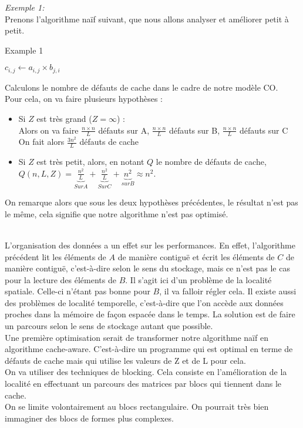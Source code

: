 \documentclass[
  paper=a4,
  ,captions=tableheading
]{scrartcl}
\begin{document}
\emph{Exemple 1:}\\
Prenons l'algorithme naïf suivant, que nous allons analyser et améliorer
petit à petit.

\begin{algorithm}[H]
\caption{Example 1}
\begin{algorithmic}[1]
\Statex
 
      \State $c_{i,j} \gets a_{i,j} \times b_{j,i}$
    \EndFor
  \EndFor
\end{algorithmic}
\end{algorithm}

Calculons le nombre de défauts de cache dans le cadre de notre modèle
CO.\\
Pour cela, on va faire plusieurs hypothèses :

\begin{itemize}
\item
  Si \(Z\) est très grand (\(Z = \infty\)) :\\
  Alors on va faire \(\frac{n \times n}{L}\) défauts sur A,
  \(\frac{n \times n}{L}\) défauts sur B, \(\frac{n \times n}{L}\)
  défauts sur C\\
  On fait alors \(\frac{3n^2}{L}\) défauts de cache
\item
  Si \(Z\) est très petit, alors, en notant \(Q\) le nombre de défauts
  de cache,\\
  \(Q(n, L, Z) = \underbrace{ \frac{n^2}{L}}_{Sur A} + \underbrace{\frac{n^2}{L}}_{Sur C} + \underbrace{n^2}_{sur B} \approx n^2\).
\end{itemize}

On remarque alors que sous les deux hypothèses précédentes, le résultat
n'est pas le même, cela signifie que notre algorithme n'est pas
optimisé.

~\\
L'organisation des données a un effet sur les performances. En effet,
l'algorithme précédent lit les éléments de \(A\) de manière contiguë et
écrit les éléments de \(C\) de manière contiguë, c'est-à-dire selon le
sens du stockage, mais ce n'est pas le cas pour la lecture des éléments
de \(B\). Il s'agit ici d'un problème de la localité spatiale. Celle-ci
n'étant pas bonne pour \(B\), il va falloir régler cela. Il existe aussi
des problèmes de localité temporelle, c'est-à-dire que l'on accède aux
données proches dans la mémoire de façon espacée dans le temps. La
solution est de faire un parcours selon le sens de stockage autant que
possible.\\
Une première optimisation serait de transformer notre algorithme naïf en
algorithme cache-aware. C'est-à-dire un programme qui est optimal en
terme de défauts de cache mais qui utilise les valeurs de Z et de L pour
cela.\\
On va utiliser des techniques de blocking. Cela consiste en
l'amélioration de la localité en effectuant un parcours des matrices par
blocs qui tiennent dans le cache.\\
On se limite volontairement au blocs rectangulaire. On pourrait très
bien immaginer des blocs de formes plus complexes.
\end{document}
